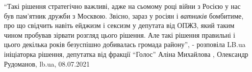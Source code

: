 \enquote{Такі рішення стратегічно важливі, адже на сьомому році війни з Росією у нас
був пам'ятник дружби з Москвою. Звісно, зараз у росіян і \emph{ватників} бомбитиме,
про що свідчить навіть ейджизм і сексизм у депутата від ОПЖЗ, який таким чином
пробував зірвати розгляд цього рішення. Але такі рішення правильні і цього
декілька років безуспішно добивалась громада району}, - розповіла LB.ua
ініціаторка рішення, депутатка від фракції \enquote{Голос} Аліна Михайлова
, 
Олександр Рудоманов, lb.ua, 08.07.2021
